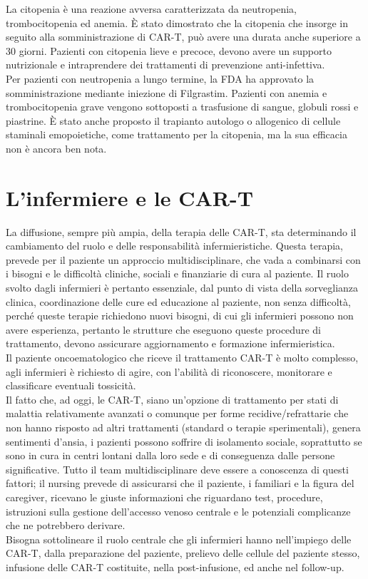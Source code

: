 La citopenia è una reazione avversa caratterizzata da neutropenia, trombocitopenia ed anemia. 
È stato dimostrato che la citopenia che insorge in seguito alla somministrazione di CAR-T, può avere una durata anche 
superiore a 30 giorni\cite{Frontiers}.
Pazienti con citopenia lieve e precoce, devono avere un supporto nutrizionale e intraprendere dei trattamenti di 
prevenzione anti-infettiva.\\ 
Per pazienti con neutropenia a lungo termine, la FDA ha approvato la somministrazione mediante iniezione di Filgrastim. 
Pazienti con anemia e trombocitopenia grave vengono sottoposti a trasfusione di sangue, globuli rossi e piastrine. 
È stato anche proposto il trapianto autologo o allogenico di cellule staminali emopoietiche, come trattamento per 
la citopenia, ma la sua efficacia non è ancora ben nota\cite{Frontiers}.

\section{L’infermiere e le CAR-T}

La diffusione, sempre più ampia, della terapia delle CAR-T, sta determinando il cambiamento del ruolo e delle 
responsabilità infermieristiche. Questa terapia, prevede per il paziente un approccio multidisciplinare, che vada a 
combinarsi con i bisogni e le difficoltà cliniche, sociali e finanziarie di cura al paziente. Il ruolo svolto dagli 
infermieri è pertanto essenziale, dal punto di vista della sorveglianza clinica, coordinazione delle cure ed 
educazione al paziente, non senza difficoltà, perché queste terapie richiedono nuovi bisogni, di cui gli infermieri 
possono non avere esperienza, pertanto le strutture che eseguono queste procedure di trattamento, 
devono assicurare aggiornamento e formazione infermieristica\cite{article2}.\\

Il paziente oncoematologico che riceve il trattamento CAR-T è molto complesso, agli infermieri è richiesto 
di agire, con l’abilità di riconoscere, monitorare e classificare eventuali tossicità\cite{NURSINGCART}.\\
Il fatto che, ad oggi, le CAR-T, siano un’opzione di trattamento per stati di malattia relativamente avanzati o comunque 
per forme recidive/refrattarie che non hanno risposto ad altri trattamenti (standard o terapie sperimentali), 
genera sentimenti d’ansia, i pazienti possono soffrire di isolamento sociale, soprattutto se sono in cura in centri 
lontani dalla loro sede e di conseguenza dalle persone significative. Tutto il team multidisciplinare deve essere a 
conoscenza di questi fattori; il nursing prevede di assicurarsi che il paziente, i familiari e la figura del caregiver, 
ricevano le giuste informazioni che riguardano test, procedure, istruzioni sulla gestione dell’accesso 
venoso centrale e le potenziali complicanze che ne potrebbero derivare\cite{NURSINGCART}.\\
Bisogna sottolineare il ruolo centrale che gli infermieri hanno nell’impiego delle CAR-T, dalla preparazione del 
paziente, prelievo delle cellule del paziente stesso, infusione delle CAR-T costituite, nella post-infusione, 
ed anche nel follow-up\cite{NURSINGCART}.\\

